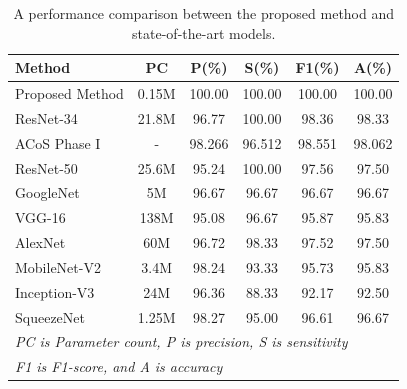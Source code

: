 \begin{table}[htbp]
\caption{ A performance comparison between the proposed method and state-of-the-art models.}
\begin{center}
\begin{tabular}{|l|c|c|c|c|c|}
\hline
\textbf{Method} & \textbf{PC} & \textbf{P(\%)}& \textbf{S(\%)}& \textbf{F1(\%)}& \textbf{A(\%)} \\
\hline
\hline
Proposed Method & 0.15M & 100.00 & 100.00 & 100.00 &100.00\\
\hline
ResNet-34~\cite{nayak2021application} & 21.8M & 96.77& 100.00 & 98.36 &98.33  \\
\hline
ACoS Phase I~\cite{chandra2021coronavirus}& - & 98.266 & 96.512 & 98.551 & 98.062 \\
\hline
ResNet-50~\cite{nayak2021application}& 25.6M& 95.24& 100.00& 97.56& 97.50 \\
\hline
GoogleNet~\cite{nayak2021application}& 5M &96.67& 96.67& 96.67& 96.67 \\
\hline
VGG-16~\cite{nayak2021application}& 138M& 95.08 & 96.67 & 95.87 &95.83\\
\hline
AlexNet~\cite{nayak2021application}& 60M& 96.72 &98.33 & 97.52& 97.50 \\
\hline
MobileNet-V2~\cite{nayak2021application} & 3.4M &98.24& 93.33& 95.73 & 95.83 \\
\hline
Inception-V3~\cite{nayak2021application}& 24M &96.36& 88.33 & 92.17& 92.50\\
\hline
SqueezeNet~\cite{nayak2021application}& 1.25M &98.27 &95.00& 96.61& 96.67 \\
\hline
\multicolumn{6}{l}{\textit{ PC is Parameter count, P is precision, S is sensitivity }}\\
\multicolumn{6}{l}{\textit{  F1 is F1-score, and A is accuracy }}\\
\hline
\end{tabular}
\label{modelperf}
\end{center}
\end{table}


